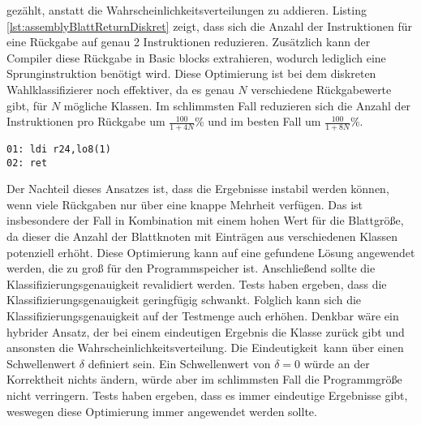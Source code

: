 gezählt, anstatt die Wahrscheinlichkeitsverteilungen zu addieren. Listing \ref{lst:assemblyBlattReturnDiskret} zeigt, dass sich die Anzahl der Instruktionen für eine Rückgabe auf genau 2 Instruktionen
reduzieren. Zusätzlich kann der Compiler diese Rückgabe in Basic blocks extrahieren, wodurch lediglich eine Sprunginstruktion benötigt wird. Diese Optimierung ist bei dem diskreten Wahlklassifizierer noch
effektiver, da es genau $N$ verschiedene Rückgabewerte gibt, für $N$ mögliche Klassen. Im schlimmsten Fall reduzieren sich die Anzahl der Instruktionen pro Rückgabe um $\frac{100}{1 + 4N}$\%
und im besten Fall um $\frac{100}{1 + 8N}$\%.
\begin{lstlisting}[label=lst:assemblyBlattReturnDiskret,caption={Beispiel des Assemblycodes der Rückgabe eines diskreten Wahlklassifizierers.}]
01: ldi r24,lo8(1)
02: ret
\end{lstlisting}
Der Nachteil dieses Ansatzes ist, dass die Ergebnisse instabil werden können, wenn viele Rückgaben nur über eine knappe Mehrheit verfügen. Das ist insbesondere der Fall in Kombination mit einem hohen Wert
für die Blattgröße, da dieser die Anzahl der Blattknoten mit Einträgen aus verschiedenen Klassen potenziell erhöht. Diese Optimierung kann auf eine gefundene Lösung angewendet werden, die zu groß für den
Programmspeicher ist. Anschließend sollte die Klassifizierungsgenauigkeit revalidiert werden. Tests haben ergeben, dass die Klassifizierungsgenauigkeit geringfügig schwankt. Folglich kann sich die
Klassifizierungsgenauigkeit auf der Testmenge auch erhöhen.
\newline
\newline
Denkbar wäre ein hybrider Ansatz, der bei einem eindeutigen Ergebnis die Klasse zurück gibt und ansonsten die Wahrscheinlichkeitsverteilung. Die \glqq Eindeutigkeit\grqq\ kann über
einen Schwellenwert $\delta$ definiert sein. Ein Schwellenwert von $\delta=0$ würde an der Korrektheit nichts ändern, würde aber im schlimmsten Fall die Programmgröße nicht verringern.
Tests haben ergeben, dass es immer eindeutige Ergebnisse gibt, weswegen diese Optimierung immer angewendet werden sollte.